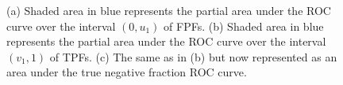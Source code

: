 \begin{figure}[ht!]
	\begin{center}
		\hspace{-0.6cm}
		\hspace{-0.6cm}
	\end{center}
	\caption{(a) Shaded area in blue represents the partial area under the ROC curve over the interval $(0,u_1)$ of FPFs. (b) Shaded area in blue represents the partial area under the ROC curve over the interval $(v_1,1)$ of TPFs. (c) The same as in (b) but now represented as an area under the true negative fraction ROC curve. }
	\label{pAUCs}
\end{figure}

